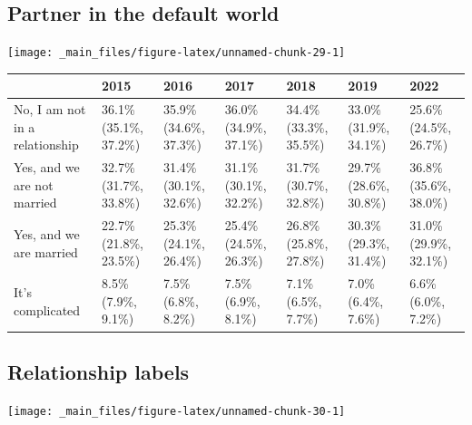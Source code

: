 \documentclass[
]{book}
\begin{document}
\hypertarget{partner-in-the-default-world}{%
\subsection{Partner in the default world}\label{partner-in-the-default-world}}

\texttt{[image: \_main\_files/figure-latex/unnamed-chunk-29-1]}

\begin{table}
\centering
\begin{tabular}[t]{>{}l|>{}l|>{}l|>{}l|>{}l|>{}l|>{}l}
\hline
  & 2015 & 2016 & 2017 & 2018 & 2019 & 2022\\
\hline
No, I am not in a relationship & 36.1\% (35.1\%, 37.2\%) & 35.9\% (34.6\%, 37.3\%) & 36.0\% (34.9\%, 37.1\%) & 34.4\% (33.3\%, 35.5\%) & 33.0\% (31.9\%, 34.1\%) & 25.6\% (24.5\%, 26.7\%)\\
\hline
Yes, and we are not married & 32.7\% (31.7\%, 33.8\%) & 31.4\% (30.1\%, 32.6\%) & 31.1\% (30.1\%, 32.2\%) & 31.7\% (30.7\%, 32.8\%) & 29.7\% (28.6\%, 30.8\%) & 36.8\% (35.6\%, 38.0\%)\\
\hline
Yes, and we are married & 22.7\% (21.8\%, 23.5\%) & 25.3\% (24.1\%, 26.4\%) & 25.4\% (24.5\%, 26.3\%) & 26.8\% (25.8\%, 27.8\%) & 30.3\% (29.3\%, 31.4\%) & 31.0\% (29.9\%, 32.1\%)\\
\hline
It's complicated & 8.5\% (7.9\%, 9.1\%) & 7.5\% (6.8\%, 8.2\%) & 7.5\% (6.9\%, 8.1\%) & 7.1\% (6.5\%, 7.7\%) & 7.0\% (6.4\%, 7.6\%) & 6.6\% (6.0\%, 7.2\%)\\
\hline
\end{tabular}
\end{table}

\hypertarget{relationship-labels}{%
\subsection{Relationship labels}\label{relationship-labels}}

\texttt{[image: \_main\_files/figure-latex/unnamed-chunk-30-1]}
\end{document}

